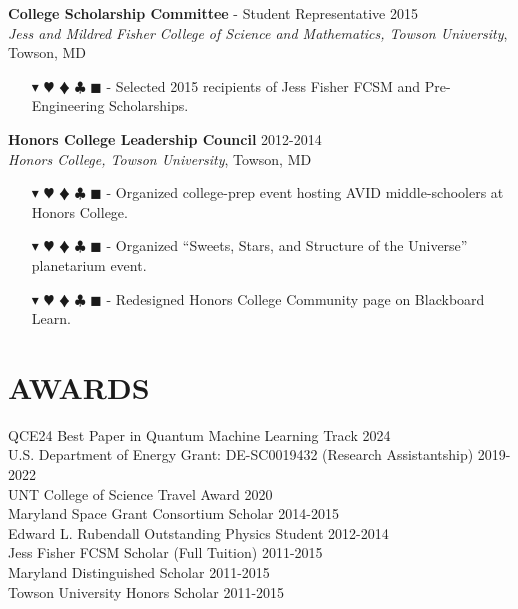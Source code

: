 \documentclass[overlapped, 10pt]{res} %
\newcommand{\physics}{$\blacktriangledown$}
\newcommand{\biochem}{$\varheartsuit$}
\newcommand{\shannon}{$\vardiamondsuit$}
\newcommand{\classic}{$\clubsuit$}
\newcommand{\quantum}{$\blacksquare$}
\newcommand{\physicscolor}{\color{YellowOrange}}
\newcommand{\biochemcolor}{\color{Emerald}}
\newcommand{\shannoncolor}{\color{Goldenrod}}
\newcommand{\classiccolor}{\color{Cyan}}
\newcommand{\quantumcolor}{\color{RedOrange}}
\newcommand{\tag}[1]{
    {\IfSubStr{#1}{\physics}{\physicscolor}{\color{White}}\physics}
    {\IfSubStr{#1}{\biochem}{\biochemcolor}{\color{White}}\biochem}
    {\IfSubStr{#1}{\shannon}{\shannoncolor}{\color{White}}\shannon}
    {\IfSubStr{#1}{\classic}{\classiccolor}{\color{White}}\classic}
    {\IfSubStr{#1}{\quantum}{\quantumcolor}{\color{White}}\quantum}
}
\begin{document}
\begin{resume}
\textbf{College Scholarship Committee} - Student Representative \hfill 2015 \\
\textit{Jess and Mildred Fisher College of Science and Mathematics, Towson University}, Towson, MD
\begin{itemize} \itemsep -2pt %
\item[\tag{}-] Selected 2015 recipients of Jess Fisher FCSM and Pre-Engineering Scholarships.
\end{itemize}

\textbf{Honors College Leadership Council} \hfill 2012-2014 \\
\textit{Honors College, Towson University}, Towson, MD
\begin{itemize} \itemsep -2pt %
\item[\tag{}-] Organized college-prep event hosting AVID middle-schoolers at Honors College.
\item[\tag{}-] Organized ``Sweets, Stars, and Structure of the Universe'' planetarium event.
\item[\tag{}-] Redesigned Honors College Community page on Blackboard Learn.
\end{itemize}




\section{AWARDS}

QCE24 Best Paper in Quantum Machine Learning Track \hfill 2024 \\
U.S. Department of Energy Grant: DE-SC0019432 (Research Assistantship) \hfill 2019-2022 \\
UNT College of Science Travel Award \hfill 2020 \\
Maryland Space Grant Consortium Scholar \hfill 2014-2015 \\
Edward L. Rubendall Outstanding Physics Student \hfill 2012-2014 \\
Jess Fisher FCSM Scholar (Full Tuition) \hfill 2011-2015 \\
Maryland Distinguished Scholar \hfill 2011-2015 \\
Towson University Honors Scholar \hfill 2011-2015



\end{resume}
\end{document}
